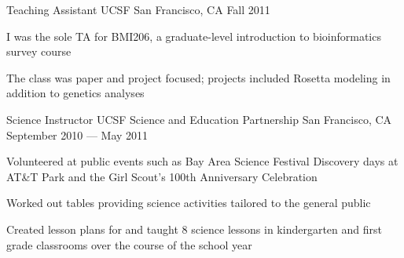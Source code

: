 \begin{cventries}
  \cventry
  {Teaching Assistant} %
  {UCSF} %
  {San Francisco, CA} %
  {Fall 2011} %
  {
    \begin{cvitems} %
    \item I was the sole TA for BMI206, a graduate-level introduction to bioinformatics survey course
    \item The class was paper and project focused; projects included Rosetta modeling in addition to genetics analyses
    \end{cvitems}
  }

  \cventry
  {Science Instructor} %
  {UCSF Science and Education Partnership} %
  {San Francisco, CA} %
  {September 2010 --- May 2011} %
  {
    \begin{cvitems} %
    \item Volunteered at public events such as Bay Area Science Festival Discovery days at AT\&T Park and the Girl Scout's 100th Anniversary Celebration
    \item Worked out tables providing science activities tailored to the general public
    \item Created lesson plans for and taught 8 science lessons in kindergarten and first grade classrooms over the course of the school year
    \end{cvitems}
  }

\end{cventries}
